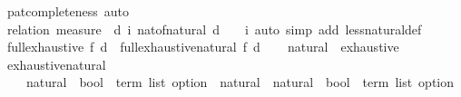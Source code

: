 \begin{isabellebody}
%
\isadelimproof
%
\endisadelimproof
%
\isatagproof
{}\isamarkupfalse%
\ pat{\isacharunderscore}{\kern0pt}completeness\ auto%
\endisatagproof
{\isafoldproof}%
%
\isadelimproof
\isanewline
%
\endisadelimproof
\isanewline
{}\isamarkupfalse%
\isanewline
%
\isadelimproof
\ \ %
\endisadelimproof
%
\isatagproof
{}\isamarkupfalse%
\ {\isacharparenleft}{\kern0pt}relation\ {\isachardoublequoteopen}measure\ {\isacharparenleft}{\kern0pt}{\isasymlambda}{\isacharparenleft}{\kern0pt}{\isacharunderscore}{\kern0pt}{\isacharcomma}{\kern0pt}\ d{\isacharcomma}{\kern0pt}\ i{\isacharparenright}{\kern0pt}{\isachardot}{\kern0pt}\ nat{\isacharunderscore}{\kern0pt}of{\isacharunderscore}{\kern0pt}natural\ {\isacharparenleft}{\kern0pt}d\ {\isacharplus}{\kern0pt}\ {}\ {\isacharminus}{\kern0pt}\ i{\isacharparenright}{\kern0pt}{\isacharparenright}{\kern0pt}{\isachardoublequoteclose}{\isacharparenright}{\kern0pt}\ {\isacharparenleft}{\kern0pt}auto\ simp\ add{\isacharcolon}{\kern0pt}\ less{\isacharunderscore}{\kern0pt}natural{\isacharunderscore}{\kern0pt}def{\isacharparenright}{\kern0pt}%
\endisatagproof
{\isafoldproof}%
%
\isadelimproof
\isanewline
%
\endisadelimproof
\isanewline
{}\isamarkupfalse%
\ {\isachardoublequoteopen}full{\isacharunderscore}{\kern0pt}exhaustive\ f\ d\ {\isacharequal}{\kern0pt}\ full{\isacharunderscore}{\kern0pt}exhaustive{\isacharunderscore}{\kern0pt}natural{\isacharprime}{\kern0pt}\ f\ d\ {}{\isachardoublequoteclose}\isanewline
\isanewline
{}\isamarkupfalse%
%
\isadelimproof
\ %
\endisadelimproof
%
\isatagproof
\isacommand{{\isachardot}{\kern0pt}{\isachardot}{\kern0pt}}\isamarkupfalse%
%
\endisatagproof
{\isafoldproof}%
%
\isadelimproof
%
\endisadelimproof
\isanewline
\isanewline
{}\isamarkupfalse%
\isanewline
\isanewline
{}\isamarkupfalse%
\ natural\ {\isacharcolon}{\kern0pt}{\isacharcolon}{\kern0pt}\ exhaustive\isanewline
{}\isanewline
\isanewline
{}\isamarkupfalse%
\ exhaustive{\isacharunderscore}{\kern0pt}natural{\isacharprime}{\kern0pt}\ {\isacharcolon}{\kern0pt}{\isacharcolon}{\kern0pt}\isanewline
\ \ \ \ {\isachardoublequoteopen}{\isacharparenleft}{\kern0pt}natural\ {\isasymRightarrow}\ {\isacharparenleft}{\kern0pt}bool\ {\isasymtimes}\ term\ list{\isacharparenright}{\kern0pt}\ option{\isacharparenright}{\kern0pt}\ {\isasymRightarrow}\ natural\ {\isasymRightarrow}\ natural\ {\isasymRightarrow}\ {\isacharparenleft}{\kern0pt}bool\ {\isasymtimes}\ term\ list{\isacharparenright}{\kern0pt}\ option{\isachardoublequoteclose}\isanewline

\end{isabellebody}
